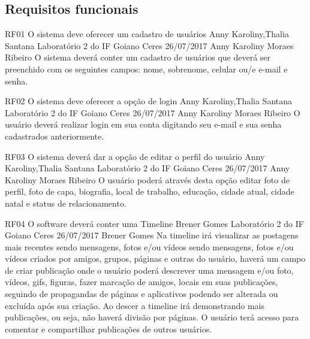 \documentclass[versao=digital]{ifgoiano_ceres_tc_v2}
\begin{document}
	\subsection{Requisitos funcionais}
	
\requisitoFuncional
{RF01}
{O sistema deve oferecer um cadastro de usuários}
{Anny Karoliny,Thalia Santana}
{Laboratório 2 do IF Goiano Ceres}
{26/07/2017}
{Anny Karoliny Moraes Ribeiro}
{O sistema deverá conter um cadastro de usuários que deverá ser preenchido com os seguintes campos: nome, sobrenome, celular ou/e e-mail e senha.
}

\requisitoFuncional
{RF02}
{O sistema deve oferecer a opção de login}
{Anny Karoliny,Thalia Santana}
{Laboratório 2 do IF Goiano Ceres}
{26/07/2017}
{Anny Karoliny Moraes Ribeiro}
{O usuário deverá realizar login em sua conta digitando seu e-mail e sua senha cadastrados anteriormente.
}

\requisitoFuncional
{RF03}
{O sistema deverá dar a opção de editar o perfil do usuário}
{Anny Karoliny,Thalia Santana}
{Laboratório 2 do IF Goiano Ceres}
{26/07/2017}
{Anny Karoliny Moraes Ribeiro}
{O usuário poderá através desta opção editar  foto de perfil, foto de capa, biografia, local de trabalho, educação, cidade atual, cidade natal e status de relacionamento.
}

\requisitoFuncional
{RF04}
{O software deverá conter uma Timeline}
{Brener Gomes}
{Laboratório 2 do IF Goiano Ceres}
{26/07/2017}
{Brener Gomes}
{Na timeline irá visualizar as postagens mais recentes sendo mensagens, fotos e/ou vídeos sendo mensagens, fotos e/ou vídeos criados por amigos, grupos, páginas e outras do usuário, haverá um campo de criar publicação onde o usuário poderá descrever uma mensagem e/ou foto, vídeos, gifs, figuras, fazer marcação de amigos, locais em suas publicações, seguindo de propagandas de páginas e aplicativos podendo ser alterada ou excluída após sua criação. Ao descer a timeline irá demonstrando mais publicações, ou seja, não haverá divisão por páginas. O usuário terá acesso para comentar e compartilhar publicações de outros usuários.
}
\end{document}
